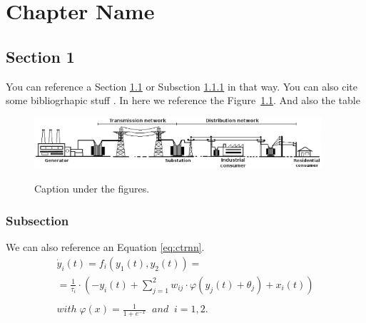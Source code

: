 \chapter{Chapter Name} \label{chap:intro}
\graphicspath{{../figs/}} 



\section{Section 1} \label{sec:sec1}

You can reference a Section \ref{sec:sec1} or Subsction
\ref{sec:subsec} in that way. 
You can also cite some bibliogrhapic stuff \citep{ExArt01,ExIncollec01,ExInpro01,ExTech01,ExBook01,ExPHD01}.
In here we reference the Figure~\ref{fig:fig1}.
And also the table

\begin{figure}[!b]	
	\begin{center}
		\includegraphics[width=0.95\textwidth]{grid_sketch.eps} \\ 
		\caption[Short description for the index.]
		{Caption under the figures.}		
		\label{fig:fig1}	
	\end{center}
\end{figure}


\subsection{Subsection}
\label{sec:subsec}

We can also reference an Equation \ref{eq:ctrnn}.
\begin{equation}
\begin{array}{l}
\dot y_{i}(t)= f_i(y_1(t),y_2(t)) = \\ 
= \frac{1}{\tau_i}\cdot\left(-y_i(t)+\sum_{j=1}^2w_{ij}\cdot \varphi\left(y_j(t)+\theta_j\right)+x_i(t)\right) \\\\
with\;\varphi(x)=\frac{1}{1+e^{-x}}\;\;and\;\;i=1,2.
\end{array}
\label{eq:ctrnn}
\end{equation}


